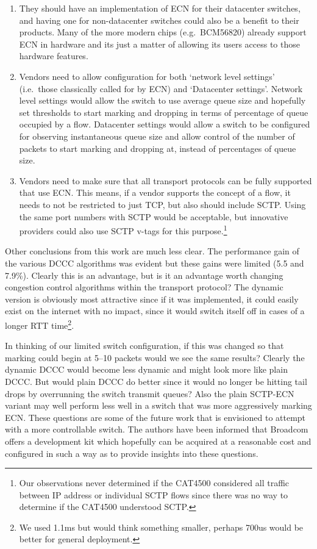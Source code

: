\documentclass[12pt]{article}
\begin{document}
\begin{enumerate}

\item They should have an implementation of ECN for their datacenter
  swit\-ches, and having one for non-datacenter switches could also be
  a benefit to their products.
  Many of the more modern chips (e.g.~BCM56820) already support ECN
  in hardware and its just a matter of allowing its users access to those hardware features.

\item Vendors need to allow configuration for both `network level settings' (i.e.~those classically called
for by ECN) and `Datacenter settings'. Network level settings would allow the switch to use average queue
size and hopefully set thresholds to start marking and dropping in terms of percentage of queue occupied by
a flow. Datacenter settings would allow a switch to be configured for observing instantaneous queue size
and allow control of the number of packets to start marking and
dropping at, instead of percentages of
queue size.

\item Vendors need to make sure that all transport protocols can be fully supported that use ECN. This
means, if a vendor supports the concept of a flow, it needs to not be restricted to just TCP, but also should include SCTP. Using the same port
numbers with SCTP would be acceptable, but innovative providers could also use SCTP v-tags for this purpose.\footnote{Our observations
never determined if the CAT4500 considered all traffic between IP address or individual SCTP flows since there was
no way to determine if the CAT4500 understood SCTP.}

\end{enumerate}

Other conclusions from this work are much less clear. The performance gain of the various DCCC algorithms
was evident but these gains were limited (5.5 and 7.9\%). Clearly this is an advantage, but is it an advantage
worth changing congestion control algorithms within the transport protocol? The dynamic version is obviously most
attractive since if it was implemented, it could easily exist on the
internet with no impact, since it would switch itself
off in cases of a longer RTT time\footnote{We used 1.1ms but would think something smaller, perhaps 700us would
be better for general deployment.}. 

In thinking of our limited switch configuration, if this was changed so that marking could begin at 5--10 packets
would we see the same results? Clearly the dynamic DCCC would become less dynamic and might look more
like plain DCCC. But would plain DCCC do better since it would no longer be hitting tail drops 
by overrunning the switch transmit queues? Also the plain SCTP-ECN variant may well perform less well 
in a switch that was more aggressively marking ECN. These questions are some of the future work that
is envisioned to attempt with a more controllable switch. The authors have been informed that Broadcom
offers a development kit which hopefully can be acquired at a reasonable cost and configured in such
a way as to provide insights into these questions.
     
\end{document}
